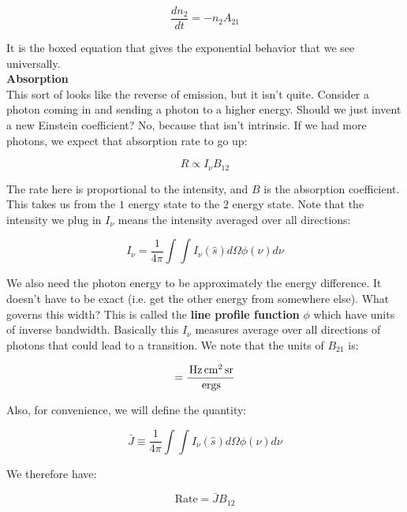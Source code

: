 \documentclass{article}
\newcommand{\unit}[1]{{\,\rm #1}}
\newcommand{\ergs}{\unit{ergs}}
\newcommand{\sr}{\unit{sr}}
\newcommand{\cm}{\unit{cm}}
\newcommand{\hz}{\unit{Hz}}
\begin{document}
\begin{equation}
    \boxed{\frac{d n_2}{dt} = -n_2 A_{21}}
\end{equation}

It is the boxed equation that gives the exponential behavior that we see universally. \\

\noindent\textbf{Absorption}\\

This sort of looks like the reverse of emission, but it isn't quite. Consider a photon coming in and sending a photon to a higher energy. Should we just invent a new Einstein coefficient? No, because that isn't intrinsic. If we had more photons, we expect that absorption rate to go up:

\begin{equation}
    R \propto I_\nu B_{12}
\end{equation}

The rate here is proportional to the intensity, and $B$ is the absorption coefficient. This takes us from the $1$ energy state to the $2$ energy state. Note that the intensity we plug in $I_\nu$ means the intensity averaged over all directions:

\begin{equation}
    I_\nu = \frac{1}{4\pi} \int \int I_\nu(\hat{s}) d\Omega \phi(\nu) d\nu
\end{equation}

We also need the photon energy to be approximately the energy difference. It doesn't have to be exact (i.e. get the other energy from somewhere else). What governs this width? This is called the \textbf{line profile function} $\phi$ which have units of inverse bandwidth. Basically this $I_\nu$ measures average over all directions of photons that could lead to a transition. We note that the units of $B_{21}$ is:

\begin{equation}
    [B_{12}] = \frac{\hz \cm^2 \sr}{\ergs}
\end{equation}

Also, for convenience, we will define the quantity:

\begin{equation}
    \bar{J} \equiv \frac{1}{4\pi} \int \int I_\nu(\hat{s}) d\Omega \phi(\nu) d\nu
\end{equation}

We therefore have:

\begin{equation}
    \text{Rate} = \bar{J} B_{12}
\end{equation}
\end{document}
